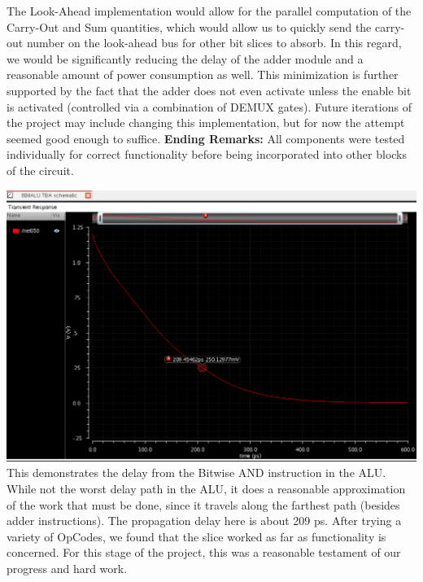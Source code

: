 \documentclass[12pt]{article}
\begin{document}
	\newline \newline
	The Look-Ahead implementation would allow for the parallel computation of the Carry-Out and
	Sum quantities, which would allow us to quickly send the carry-out number on the look-ahead
	bus for other bit slices to absorb. In this regard, we would be significantly reducing the delay
	of the adder module and a reasonable amount of power consumption as well. This minimization
	is further supported by the fact that the adder does not even activate unless the enable bit
	is activated (controlled via a combination of DEMUX gates). Future iterations of the project 
	may include changing this implementation, but for now the attempt seemed good enough to
	suffice.
	\newline \newline
	\textbf{Ending Remarks:}
	\newline \newline
	All components were tested individually for correct functionality before being incorporated 
	into other blocks of the circuit.
	\newline \newline
	
  	\includegraphics[scale=0.4]{AndDelay.png} \\
	\newline \newline
  	This demonstrates the delay from the Bitwise AND instruction in the ALU. While not the worst 
	delay path in the ALU, it does a reasonable approximation of the work that must be done, since 
	it travels along the farthest path (besides adder instructions). The propagation delay
	here is about 209 ps.
	\newline \newline
	After trying a variety of OpCodes, we found that the slice worked as far as functionality 
	is concerned. For this stage of the project, this was a reasonable testament of our progress
	and hard work.
\end{document}
